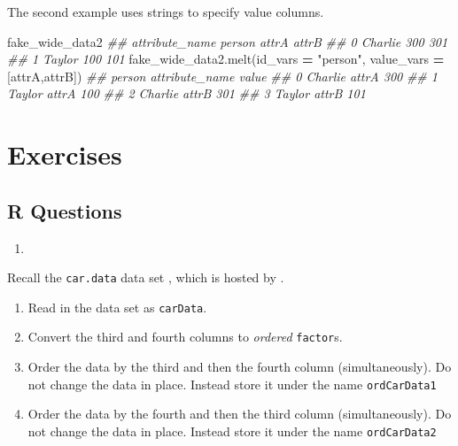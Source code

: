 \documentclass[
  12pt,
  krantz2]{krantz}
\makeatletter
\newenvironment{Shaded}{\begin{snugshade}}{\end{snugshade}}
\newcommand{\CommentTok}[1]{\textcolor[rgb]{0.37,0.37,0.37}{\textit{#1}}}
\newcommand{\NormalTok}[1]{#1}
\newcommand{\OperatorTok}[1]{\textcolor[rgb]{0.43,0.43,0.43}{\textbf{#1}}}
\newcommand{\StringTok}[1]{\textcolor[rgb]{0.5,0.5,0.5}{#1}}
\providecommand{\tightlist}{%
  \setlength{\itemsep}{0pt}\setlength{\parskip}{0pt}}
\newenvironment{kframe}{%
\medskip{}
\setlength{\fboxsep}{.8em}
 \def\at@end@of@kframe{}%
 \ifinner\ifhmode%
  \def\at@end@of@kframe{\end{minipage}}%
  \begin{minipage}{\columnwidth}%
 \fi\fi%
 \def\FrameCommand##1{\hskip\@totalleftmargin \hskip-\fboxsep
 \colorbox{shadecolor}{##1}\hskip-\fboxsep
     \hskip-\linewidth \hskip-\@totalleftmargin \hskip\columnwidth}%
 \MakeFramed {\advance\hsize-\width
   \@totalleftmargin\z@ \linewidth\hsize
   \@setminipage}}%
 {\par\unskip\endMakeFramed%
 \at@end@of@kframe}
\renewenvironment{Shaded}{\begin{kframe}}{\end{kframe}}
\makeatother
\begin{document}
The second example uses strings to specify value columns.

\begin{Shaded}
\begin{Highlighting}[]
\NormalTok{fake\_wide\_data2}
\CommentTok{\#\# attribute\_name   person  attrA  attrB}
\CommentTok{\#\# 0               Charlie    300    301}
\CommentTok{\#\# 1                Taylor    100    101}
\NormalTok{fake\_wide\_data2.melt(id\_vars }\OperatorTok{=} \StringTok{"person"}\NormalTok{, }
\NormalTok{                     value\_vars }\OperatorTok{=}\NormalTok{ [}\StringTok{\textquotesingle{}attrA\textquotesingle{}}\NormalTok{,}\StringTok{\textquotesingle{}attrB\textquotesingle{}}\NormalTok{])}
\CommentTok{\#\#     person attribute\_name  value}
\CommentTok{\#\# 0  Charlie          attrA    300}
\CommentTok{\#\# 1   Taylor          attrA    100}
\CommentTok{\#\# 2  Charlie          attrB    301}
\CommentTok{\#\# 3   Taylor          attrB    101}
\end{Highlighting}
\end{Shaded}

\hypertarget{exercises-10}{%
\section{Exercises}\label{exercises-10}}

\hypertarget{r-questions-9}{%
\subsection{R Questions}\label{r-questions-9}}

\begin{enumerate}
\def\labelenumi{\arabic{enumi}.}
\tightlist
\item
\end{enumerate}

Recall the \texttt{car.data} data set \citep{misc_car_evaluation_19}, which is hosted by \citep{uci_data}.

\begin{enumerate}
\def\labelenumi{\alph{enumi})}
\tightlist
\item
  Read in the data set as \texttt{carData}.
\item
  Convert the third and fourth columns to \emph{ordered} \texttt{factor}s.
\item
  Order the data by the third and then the fourth column (simultaneously). Do not change the data in place. Instead store it under the name \texttt{ordCarData1}
\item
  Order the data by the fourth and then the third column (simultaneously). Do not change the data in place. Instead store it under the name \texttt{ordCarData2}
\end{enumerate}
\end{document}
